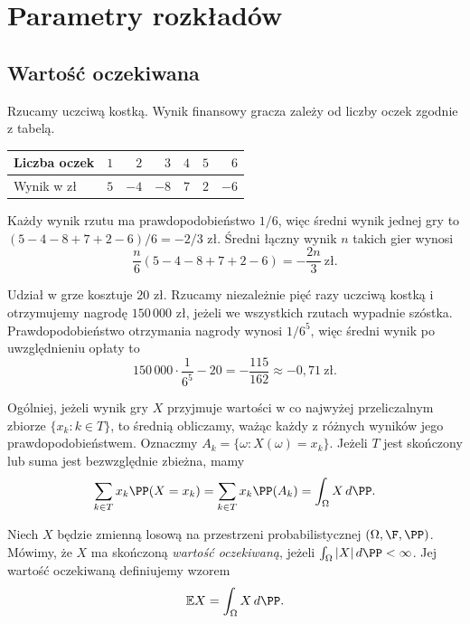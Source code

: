 \chapter{Parametry rozkładów}
\label{chap:parametry-rozkladow}

\section{Wartość oczekiwana}
\label{sec:wartosc-oczekiwana}

\begin{przyklad}
Rzucamy uczciwą kostką. Wynik finansowy gracza zależy od liczby oczek
zgodnie z tabelą.
\begin{center}
  \begin{tabular}{lrrrrrr}
    \hline
    Liczba oczek & $1$ & $2$ & $3$ & $4$ & $5$ & $6$\\
    \hline
    Wynik w zł & $5$ & $-4$ & $-8$ & $7$ & $2$ & $-6$\\
    \hline
  \end{tabular}
\end{center}
Każdy wynik rzutu ma prawdopodobieństwo $1/6$, więc średni wynik jednej gry
to $(5-4-8+7+2-6)/6=-2/3$ zł. Średni łączny wynik $n$ takich gier wynosi
\[
  \frac{n}{6}(5-4-8+7+2-6)=-\frac{2n}{3}\ \text{zł}.
\]
\end{przyklad}

\begin{przyklad}
Udział w grze kosztuje $20$ zł. Rzucamy niezależnie pięć razy uczciwą
kostką i otrzymujemy nagrodę $150\,000$ zł, jeżeli we wszystkich rzutach
wypadnie szóstka. Prawdopodobieństwo otrzymania nagrody wynosi $1/6^5$,
więc średni wynik po uwzględnieniu opłaty to
\[
  150\,000\cdot\frac{1}{6^5}-20=-\frac{115}{162}\approx -0{,}71\ \text{zł}.
\]
\end{przyklad}

Ogólniej, jeżeli wynik gry $X$ przyjmuje wartości w co najwyżej
przeliczalnym zbiorze $\{x_k:k\in T\}$, to średnią obliczamy, ważąc
każdy z różnych wyników jego prawdopodobieństwem. Oznaczmy
$A_k=\{\omega:X(\omega)=x_k\}$. Jeżeli $T$ jest skończony lub suma
jest bezwzględnie zbieżna, mamy
\[
  \sum_{k\in T} x_k\PP(X=x_k)
  =\sum_{k\in T}x_k\PP(A_k)
  =\int_\Omega X\,d\PP.
\]

\begin{definicja}
\label{def:wartosc-oczekiwana}
Niech $X$ będzie zmienną losową na przestrzeni probabilistycznej
$(\Omega,\F,\PP)$. Mówimy, że $X$ ma skończoną \emph{wartość oczekiwaną},
jeżeli $\int_\Omega|X|\,d\PP<\infty$. Jej wartość oczekiwaną definiujemy wzorem
\[
  \mathbb{E}X=\int_\Omega X\,d\PP.
\]
\end{definicja}

